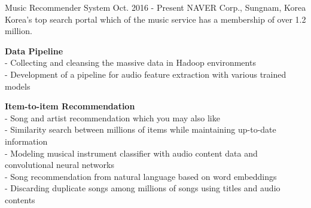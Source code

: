 

\begin{cventries}
    \cventry
        {Music Recommender System} %
        {Oct. 2016 - Present} %
        {NAVER Corp.,} %
        {Sungnam, Korea}%
        { %
            Korea's top search portal which of the music service has a membership of over 1.2 million.
        }
        { %
            \begin{cvitems}
                \item {
                    {\bf Data Pipeline} \\
                    - Collecting and cleansing the massive data in Hadoop environments
                         \\
                    - Development of a pipeline for audio feature extraction with various trained models
                         \nn
                }
                \item {
                    {\bf Item-to-item Recommendation} \\
                    - Song and artist recommendation which you may also like
                         \\
                    - Similarity search between millions of items while maintaining up-to-date information
                         \\
                    - Modeling musical instrument classifier with audio content data and convolutional neural networks
                         \\
                    - Song recommendation from natural language based on word embeddings
                         \\
                    - Discarding duplicate songs among millions of songs using titles and audio contents
                         \nn
                }
                \item {
}
\end{cvitems}}
\end{cventries}
